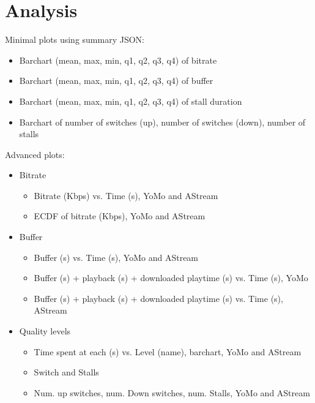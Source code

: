 
\section{Analysis}\label{sec:analysis}

Minimal plots using summary \ac{JSON}:
\begin{itemize}
\item Barchart (mean, max, min, q1, q2, q3, q4) of bitrate
\item Barchart (mean, max, min, q1, q2, q3, q4) of buffer
\item Barchart (mean, max, min, q1, q2, q3, q4) of stall duration
\item Barchart of number of switches (up), number of switches (down),  number of stalls
\end{itemize}


Advanced plots:

\begin{itemize}
\item Bitrate
\begin{itemize}
\item Bitrate (Kbps) vs. Time (s), YoMo and AStream
\item \ac{ECDF} of bitrate (Kbps), YoMo and AStream
\end{itemize}
\item Buffer
\begin{itemize}
\item Buffer (s) vs. Time (s), YoMo and AStream 
\item Buffer (s) + playback (s) + downloaded playtime (s) vs. Time (s), YoMo
\item Buffer (s) + playback (s) + downloaded playtime (s) vs. Time (s), AStream
\end{itemize}
\item Quality levels
\begin{itemize}
\item Time spent at each (s) vs. Level (name), barchart, YoMo and AStream
\item Switch and Stalls
\item Num. up switches, num. Down switches, num. Stalls, YoMo and AStream
\end{itemize}
\end{itemize}

